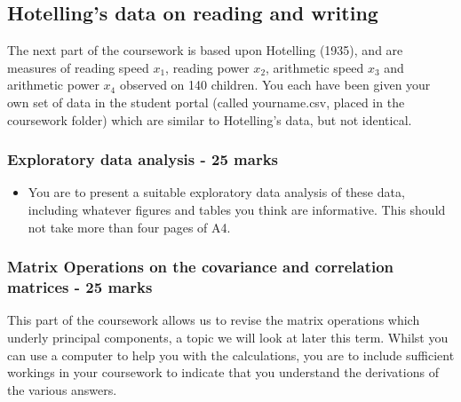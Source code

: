 \documentclass[11pt]{article}
\begin{document}
\subsection{Hotelling's data on reading and writing}

The next part of the coursework is based upon Hotelling (1935), and are measures of reading speed $x_{1}$, reading power $x_{2}$, arithmetic speed $x_{3}$ and arithmetic power $x_{4}$ observed on 140 children.   You each have been given your own set of data in the student portal (called yourname.csv, placed in the coursework folder) which are similar to Hotelling's data, but not identical. 

\subsubsection{Exploratory data analysis - 25 marks}

\begin{itemize}
\item You are to present a suitable exploratory data analysis of these data, including whatever figures and tables you think are informative.   This should not take more than four pages of A4.
\end{itemize}



\subsubsection{Matrix Operations on the covariance and correlation matrices - 25 marks}

This part of the coursework allows us to revise the matrix operations which underly principal components, a topic we will look at later this term.   Whilst you can use a computer to help you with the calculations, you are to include sufficient workings in your coursework to indicate that you understand the derivations of the various answers.
\end{document}
